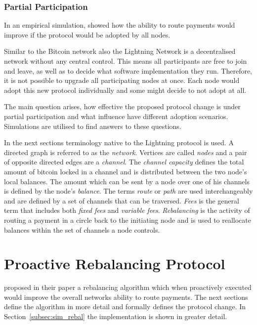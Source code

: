 \documentclass[final]{fhnwreport}       %
\begin{document}
\subsubsection{Partial Participation}
In an empirical simulation, \citeauthor{pickhardt_imbalance_2019} showed how the ability to route payments would improve if the protocol would be adopted by all nodes. 

Similar to the Bitcoin network also the Lightning Network is a decentralised network without any central control. This means all participants are free to join and leave, as well as to decide what software implementation they run. Therefore, it is not possible to upgrade all participating nodes at once. Each node would adopt this new protocol individually and some might decide to not adopt at all. 

The main question arises, how effective the proposed protocol change is under partial participation and what influence have different adoption scenarios. Simulations are utilised to find answers to these questions.

In the next sections terminology native to the Lightning protocol is used. A directed graph is referred to as the \emph{network}. Vertices are called \emph{nodes} and a pair of opposite directed edges are a \emph{channel}. The \emph{channel capacity} defines the total amount of bitcoin locked in a channel and is distributed between the two node's local balances. The amount which can be sent by a node over one of his channels is defined by the node's \emph{balance}. The terms \emph{route} or \emph{path} are used interchangeably and are defined by a set of channels that can be traversed. \emph{Fees} is the general term that includes both \emph{fixed fees} and \emph{variable fees}. \emph{Rebalancing} is the activity of routing a payment in a circle back to the initiating node and is used to reallocate balances within the set of channels a node controls.   

\newpage
\section{Proactive Rebalancing Protocol}\label{sec:rebal}
\textcite{pickhardt_imbalance_2019} proposed in their paper a rebalancing algorithm which when proactively executed would improve the overall networks ability to route payments. The next sections define the algorithm in more detail and formally defines the protocol change. In Section~\ref{subsec:sim_rebal} the implementation is shown in greater detail.
\end{document}
